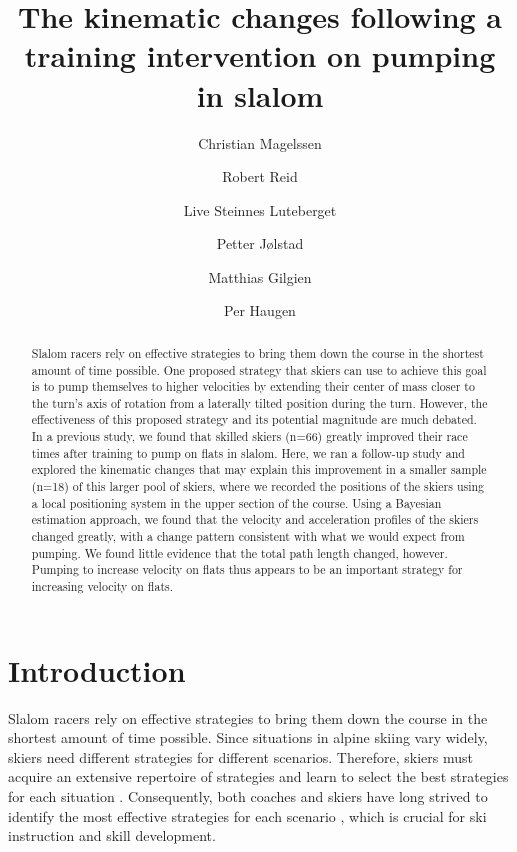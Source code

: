 \documentclass{article}
\author[1]{Christian Magelssen}
\author[2]{Robert Reid}
\author[4]{Live Steinnes Luteberget}
\author[4]{Petter Jølstad}
\author[3]{Matthias Gilgien}
\author[4]{Per Haugen}
\affil[1]{Department of Mathematics, University X}
\affil[2]{Department of Biology, University Y}
\affil[4]{Department of Physical Performance, Norwegian School of Sport Sciences, Oslo, Norway}
\title{The kinematic changes following a training intervention on pumping in slalom}
\begin{document}
\maketitle

\begin{abstract}
Slalom racers rely on effective strategies to bring them down the course in the shortest amount of time possible. One proposed strategy that skiers can use to achieve this goal is to pump themselves to higher velocities by extending their center of mass closer to the turn's axis of rotation from a laterally tilted position during the turn. However, the effectiveness of this proposed strategy and its potential magnitude are much debated. In a previous study, we found that skilled skiers (n=66) greatly improved their race times after training to pump on flats in slalom. Here, we ran a follow-up study and explored the kinematic changes that may explain this improvement in a smaller sample (n=18) of this larger pool of skiers, where we recorded the positions of the skiers using a local positioning system in the upper section of the course. Using a Bayesian estimation approach, we found that the velocity and acceleration profiles of the skiers changed greatly, with a change pattern consistent with what we would expect from pumping. We found little evidence that the total path length changed, however. Pumping to increase velocity on flats thus appears to be an important strategy for increasing velocity on flats.
    
\end{abstract}


\section{Introduction}
Slalom racers rely on effective strategies to bring them down the course in the shortest amount of time possible\cite{lesnik_best_2007, sporri_course_2012, sporri_turn_2012,supej_impact_2015, supej_relations_2006}.  Since situations in alpine skiing vary widely, skiers need different strategies for different scenarios. Therefore, skiers must acquire an extensive repertoire of strategies and learn to select the best strategies for each situation \cite{supej_impact_2015}. Consequently, both coaches and skiers have long strived to identify the most effective strategies for each scenario \cite{lemaster_skiers_1999, lemaster_ultimate_2010, joubert_how_1967,joubert_ski_1978, howe_new_2001, lind_physics_2013, muller_analysis_1994}, which is crucial for ski instruction and skill development.
\end{document}
